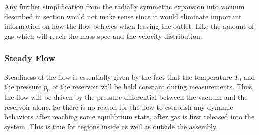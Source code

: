 		Any further simplification from the radially symmetric expansion into vacuum described in section would not make sense since it would eliminate important information on how the flow behaves when leaving the outlet.
		Like the amount of gas which will reach the mass spec and the velocity distribution.
\cite{anderson2021modern}

\subsubsection{Steady Flow}

	Steadiness of the flow is essentially given by the fact that the temperature $T_0$ and the pressure $p_0$ of the reservoir will be held constant during measurements.
	Thus, the flow will be driven by the pressure differential between the vacuum and the reservoir alone.
	So there is no reason for the flow to establish any dynamic behaviors after reaching some equilibrium state, after gas is first released into the system.
	This is true for regions inside as well as outside the assembly.
